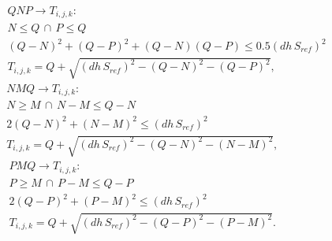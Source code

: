 \begin{multline}
	QNP \to T_{i,j,k}: \\	
	N \le Q \,\cap\, P \le Q \\
	(Q-N)^2 + (Q-P)^2 + (Q-N)(Q-P) \le 0.5(dh\,S_{ref})^2 \\
	T_{i,j,k} = Q + \sqrt{(dh\,S_{ref})^2 - (Q-N)^2 - (Q-P)^2}, \,\,\,\,\,\,\,\,\,\,\,\,\,\,\,\,\,\,\,\,\,\,\,\,\,\,\,\,\,\,\,\,\,   
	\label{QNP-R}
\end{multline}
\begin{multline}
	NMQ \to T_{i,j,k}: \\	
	N \ge M \,\cap\, N-M \le Q-N \\
	2(Q-N)^2 + (N-M)^2 \le (dh\,S_{ref})^2 \\
	T_{i,j,k} = Q + \sqrt{(dh\,S_{ref})^2 - (Q-N)^2 - (N-M)^2}, \,\,\,\,\,\,\,\,\,\,\,\,\,\,\,\,\,\,\,\,\,\,\,\,\,\,\,\,\,\,\,\,
	\label{NMQ-R}
\end{multline}
\begin{multline}
	PMQ \to T_{i,j,k}: \\	
	P \ge M \,\cap\, P-M \le Q-P \\
	2(Q-P)^2 + (P-M)^2 \le (dh\,S_{ref})^2 \\
	T_{i,j,k} = Q + \sqrt{(dh\,S_{ref})^2 - (Q-P)^2 - (P-M)^2}. \,\,\,\,\,\,\,\,\,\,\,\,\,\,\,\,\,\,\,\,\,\,\,\,\,\,\,\,\,\,\,\,
	\label{PMQ-R}
\end{multline}

